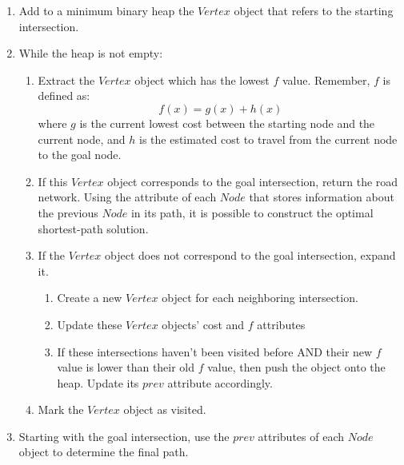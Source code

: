 \documentclass[conference]{IEEEtran}
\begin{document}
\begin{enumerate}
    \item Add to a minimum binary heap the $Vertex$ object that refers to the starting intersection.

    \item While the heap is not empty:

    \begin{enumerate}
        \item Extract the $Vertex$ object which has the lowest $f$ value. Remember, $f$ is defined as:
        \[f(x) = g(x) + h(x)\]
        where $g$ is the current lowest cost between the starting node and the current node, and $h$ is the estimated cost to travel from the current node to the goal node.

        \item If this $Vertex$ object corresponds to the goal intersection, return the road network. Using the attribute of each $Node$ that stores information about the previous $Node$ in its path, it is possible to construct the optimal shortest-path solution.

        \item If the $Vertex$ object does not correspond to the goal intersection, expand it.

        \begin{enumerate}
            \item Create a new $Vertex$ object for each neighboring intersection.

            \item Update these $Vertex$ objects’ cost and $f$ attributes

            \item If these intersections haven’t been visited before AND their new $f$ value is lower than their old $f$ value, then push the object onto the heap. Update its $prev$ attribute accordingly.

        \end{enumerate}

        \item Mark the $Vertex$ object as visited.

    \end{enumerate}

    \item Starting with the goal intersection, use the $prev$ attributes of each $Node$ object to determine the final path.

\end{enumerate}
\end{document}
